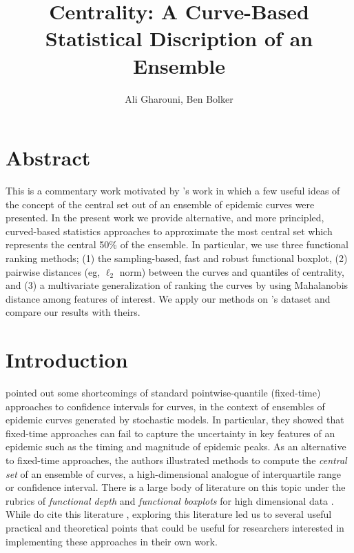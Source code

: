 \documentclass[12pt]{article}
\title{Centrality: A Curve-Based Statistical Discription of an Ensemble}
\author{Ali Gharouni, Ben Bolker}
\theoremstyle{definition} %
\begin{document}
\maketitle
\linenumbers

\section{Abstract}
This is a commentary work motivated by \cite{juul2021fixed}'s work in which a few useful ideas of the concept of the central set out of an ensemble of epidemic curves were presented. In the present work we provide alternative, and more principled, curved-based statistics approaches to approximate the most central set which represents the central 50\% of the ensemble. In particular, we use three functional ranking methods; (1) the sampling-based, fast and robust functional boxplot, 
(2) pairwise distances (eg, $\ell_2$ norm) between the curves and quantiles of centrality, and (3) a multivariate generalization of ranking the curves by using Mahalanobis distance among features of interest. We apply our methods on \cite{juul2021fixed}'s dataset and compare our results with theirs.      

\section{Introduction}

\cite{juul2021fixed} pointed out some shortcomings of standard pointwise-quantile (fixed-time) approaches to confidence intervals for curves, in the context of ensembles of epidemic curves generated by stochastic models. In particular, they showed that fixed-time approaches can fail to capture the uncertainty in key features of an epidemic such as the timing and magnitude of epidemic peaks.  As an alternative to fixed-time approaches, the authors illustrated methods to compute the \emph{central set} of an ensemble of curves, a high-dimensional analogue of interquartile range or confidence interval. There is a large body of literature on this topic under the rubrics of \emph{functional depth} and \emph{functional boxplots} for high dimensional data \citep{fraiman2001trimmed, lopez2007depth, lopez2009concept, sun2011functional,sun2012exact}. While \cite{juul2021fixed} do cite this literature \citep{sun2011functional}, exploring this literature led us to several useful practical and theoretical points that could be useful for researchers interested in implementing these approaches in their own work.
\end{document}

